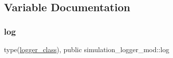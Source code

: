 \subsection{Variable Documentation}
\mbox{\label{namespacesimulation__logger__mod_aa778de9905350741e1f40bb04fdc1cf6}} 
\subsubsection{\texorpdfstring{log}{log}}
{\footnotesize\ttfamily type(\hyperlink{structsimulation__logger__mod_1_1logger__class}{logger\+\_\+class}), public simulation\+\_\+logger\+\_\+mod\+::log}

